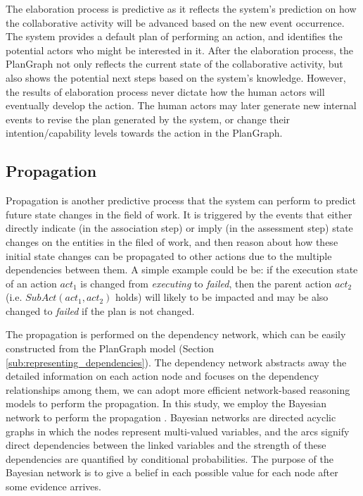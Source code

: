 The elaboration process is predictive as it reflects the system's prediction on how the collaborative activity will be advanced based on the new event occurrence. The system provides a default plan of performing an action, and identifies the potential actors who might be interested in it. After the elaboration process, the PlanGraph not only reflects the current state of the collaborative activity, but also shows the potential next steps based on the system's knowledge. However, the results of elaboration process never dictate how the human actors will eventually develop the action. The human actors may later generate new internal events to revise the plan generated by the system, or change their intention/capability levels towards the action in the PlanGraph.
\subsection{Propagation} %
\label{sub:propagation}
Propagation is another predictive process that the system can perform to predict future state changes in the field of work. It is triggered by the events that either directly indicate (in the association step) or imply (in the assessment step) state changes on the entities in the filed of work, and then reason about how these initial state changes can be propagated to other actions due to the multiple dependencies between them. A simple example could be be: if the execution state of an action $act_1$ is changed from \emph{executing} to \emph{failed}, then the parent action $act_2$ (i.e. $SubAct(act_1, act_2)$ holds) will likely to be impacted and may be also changed to \emph{failed} if the plan is not changed. 

The propagation is performed on the dependency network, which can be easily constructed from the PlanGraph model (Section \ref{sub:representing_dependencies}). The dependency network abstracts away the detailed information on each action node and focuses on the dependency relationships among them, we can adopt more efficient network-based reasoning models to perform the propagation. In this study, we employ the Bayesian network to perform the propagation \cite{pearl1988probabilistic}. Bayesian networks are directed acyclic graphs in which the nodes represent multi-valued variables, and the arcs signify direct dependencies between the linked variables and the strength of these dependencies are quantified by conditional probabilities. The purpose of the Bayesian network is to give a belief in each possible value for each node after some evidence arrives.

